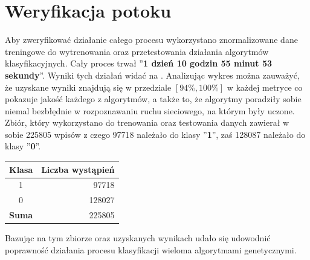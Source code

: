 \section{Weryfikacja potoku}
Aby zweryfikować działanie całego procesu wykorzystano znormalizowane dane treningowe do wytrenowania oraz przetestowania działania algorytmów klasyfikacyjnych. Cały proces trwał ''\textbf{1 dzień 10 godzin 55 minut 53 sekundy}''. Wyniki tych działań widać na . Analizując wykres można zauważyć, że uzyskane wyniki znajdują się w przedziale $[94\%, 100\%]$ w każdej metryce co pokazuje jakość każdego z algorytmów, a także to, że algorytmy poradziły sobie niemal bezbłędnie w rozpoznawaniu ruchu sieciowego, na którym były uczone. Zbiór, który wykorzystano do trenowania oraz testowania danych zawierał w sobie 225805 wpisów z czego 97718 należało do klasy ''\textbf{1}'', zaś 128087 należało do klasy ''\textbf{0}''.

\begin{table}[H]
    \centering
    \label{tab:trening-data-label}
    \begin{tabular}{|c|r|} \hline
        \textbf{Klasa} & \textbf{Liczba wystąpień} \\ \hline
        1 & 97718 \\ \hline
        0 & 128027 \\ \hline
        \textbf{Suma} & 225805 \\ \hline
    \end{tabular}
\end{table}

Bazując na tym zbiorze oraz uzyskanych wynikach udało się udowodnić poprawność działania procesu klasyfikacji wieloma algorytmami genetycznymi.

